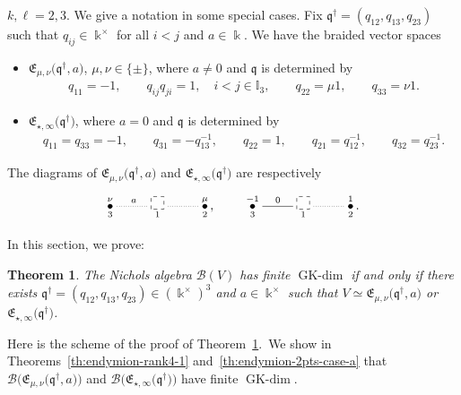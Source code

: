 \documentclass[pdftex]{sigma}
\numberwithin{equation}{section}
\newtheorem{Theorem}{Theorem}[section]
\newcommand{\GK}{\operatorname{GK-dim}}
\newcommand{\toba}{\mathscr B}
\newcommand{\I}{{\mathbb I}}
\newcommand{\eny}{\mathfrak{E}}
\newcommand{\enyIIb}[1]{\eny_{\star,#1}}
\newcommand{\bq}{\mathfrak{q}}
\newcommand{\bqs}{\bq^{\dagger}}
\begin{document}
$k,\ell = 2,3$.
We give a notation in some special cases. Fix $\bqs = (q_{12}, q_{13}, q_{23})$ such that
$q_{ij} \in \Bbbk^{\times}$ for all $i<j $ and $a \in \Bbbk$.
We have the braided vector spaces
\begin{itemize}\itemsep=0pt
\item $\eny_{\mu, \nu}\big(\bqs, a\big)$, $\mu, \nu \in \{\pm\}$, where $a \neq 0$ and $\bq$ is determined by
\begin{align*}%
q_{11} =-1,\qquad q_{ij}q_{ji} = 1, \quad i<j \in \I_3,\qquad q_{22} =\mu 1,\qquad q_{33} =\nu 1.
\end{align*}

\item$\enyIIb{\infty}\big(\bqs\big)$, where $ a= 0$ and $\bq$ is determined by
\begin{align}\label{eq:bq-IIa-b}
q_{11}= q_{33}=-1, \qquad
q_{3 1} = -q_{13}^{-1},\qquad
q_{22} = 1, \qquad q_{21} = q_{12}^{-1},\qquad
q_{3 2} = q_{23}^{-1}.
\end{align}

\end{itemize}
The diagrams of $\eny_{\mu, \nu}\big(\bqs, a\big)$ and $\enyIIb{\infty}\big(\bqs\big)$ are respectively
$$
\xymatrix{
\overset{\nu}{\underset{3}{\bullet}} \ar@{.}^{a}[r]
&\underset{1}{\begin{tikzpicture}
\draw[dashed] (0,0) rectangle (0.36,0.36);
\end{tikzpicture}} \ar @{.}[r]
& \overset{\mu}{\underset{2}{\bullet}}\,,}\qquad
\xymatrix{
\overset{-1}{\underset{3}{\bullet}} \ar@{-}^{0}[r]
&\underset{1}{\begin{tikzpicture}
\draw[dashed] (0,0) rectangle (0.36,0.36);
\end{tikzpicture}} \ar @{.}[r]
& \overset{1}{\underset{2}{\bullet}}\,.}
$$

In this section, we prove:

\begin{Theorem} \label{th:2-block-points}
The Nichols algebra
$\toba (V)$ has finite $\GK$ if and only if there exists $\bqs = (q_{12}, q_{13}, q_{23}) \in (\Bbbk^{\times})^3$ and $a\in \Bbbk^{\times}$ such that
$V\simeq \eny_{\mu, \nu}\big(\bqs, a\big)$ or $\enyIIb{\infty}\big(\bqs\big)$.
\end{Theorem}

Here is the scheme of the proof of Theorem~\ref{th:2-block-points}.\
We show in Theorems~\ref{th:endymion-rank4-1} and~\ref{th:endymion-2pts-case-a}
that $\toba \big(\eny_{\mu, \nu}\big(\bqs, a\big)\big)$ and
$\toba\big(\enyIIb{\infty}\big(\bqs\big)\big)$ have finite $\GK$.
\end{document}
